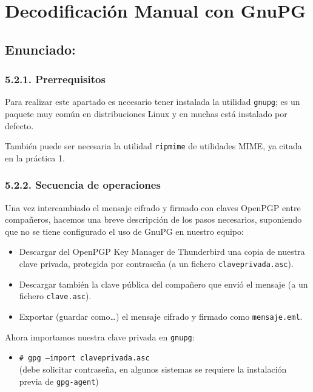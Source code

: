 \chapter{Decodificación Manual con GnuPG}

\section{Enunciado:}

\subsection*{5.2.1. Prerrequisitos}

Para realizar este apartado es necesario tener instalada la utilidad \texttt{gnupg}; es un paquete muy común
en distribuciones Linux y en muchas está instalado por defecto.

También puede ser necesaria la utilidad \texttt{ripmime} de utilidades MIME, ya citada en la práctica 1.

\subsection*{5.2.2. Secuencia de operaciones}

Una vez intercambiado el mensaje cifrado y firmado con claves OpenPGP entre compañeros,
hacemos una breve descripción de los pasos necesarios, suponiendo que no se tiene configurado el
uso de GnuPG en nuestro equipo:

\begin{itemize}[label=\textbullet]
    \item Descargar del OpenPGP Key Manager de Thunderbird una copia de nuestra clave privada, protegida
    por contraseña (a un fichero \texttt{claveprivada.asc}).
    \item Descargar también la clave pública del compañero que envió el mensaje (a un fichero \texttt{clave.asc}).
    \item Exportar (guardar como\ldots) el mensaje cifrado y firmado como \texttt{mensaje.eml}.
\end{itemize}

Ahora importamos nuestra clave privada en \texttt{gnupg}:

\begin{itemize}[label=\textbullet]
    \item \texttt{\# gpg --import claveprivada.asc} \\
    (debe solicitar contraseña, en algunos sistemas se requiere la instalación previa de \texttt{gpg-agent})
\end{itemize}

